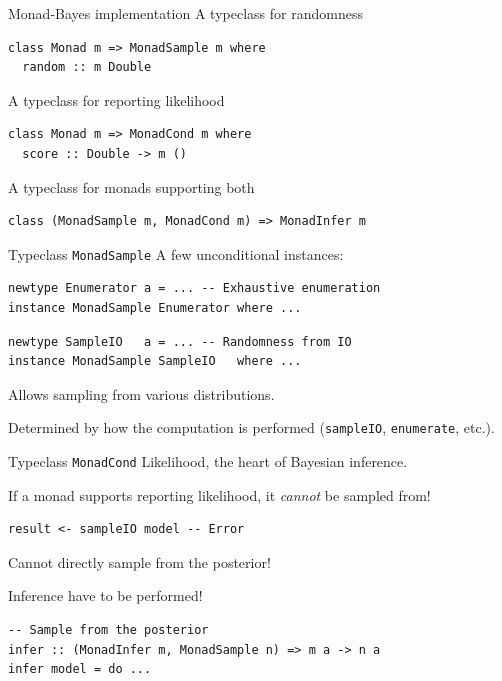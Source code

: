 \documentclass[usenames,dvipsnames,10pt]{beamer}
\begin{document}
\begin{frame}[fragile]{Monad-Bayes implementation}
A typeclass for randomness
\begin{verbatim}
class Monad m => MonadSample m where
  random :: m Double
\end{verbatim}

\bigskip

A typeclass for reporting likelihood

\begin{verbatim}
class Monad m => MonadCond m where
  score :: Double -> m ()
\end{verbatim}

\bigskip

A typeclass for monads supporting both

\begin{verbatim}
class (MonadSample m, MonadCond m) => MonadInfer m
\end{verbatim}
\end{frame}

\begin{frame}[fragile]{Typeclass \texttt{MonadSample}}
A few unconditional instances:
\begin{verbatim}
newtype Enumerator a = ... -- Exhaustive enumeration
instance MonadSample Enumerator where ...
\end{verbatim}
\begin{verbatim}
newtype SampleIO   a = ... -- Randomness from IO
instance MonadSample SampleIO   where ...
\end{verbatim}

\bigskip

Allows sampling from various distributions.

Determined by how the computation is performed (\texttt{sampleIO}, \texttt{enumerate}, etc.).
\end{frame}

\begin{frame}[fragile]{Typeclass \texttt{MonadCond}}
Likelihood, the heart of Bayesian inference.

If a monad supports reporting likelihood, it \emph{cannot} be sampled from!\begin{verbatim}
result <- sampleIO model -- Error
\end{verbatim}
Cannot directly sample from the posterior!

Inference have to be performed!

\begin{verbatim}
-- Sample from the posterior
infer :: (MonadInfer m, MonadSample n) => m a -> n a
infer model = do ...
\end{verbatim}
\end{frame}
\end{document}

